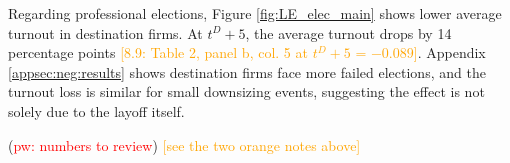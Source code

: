 Regarding professional elections, Figure \ref{fig:LE_elec_main} shows lower average turnout in destination firms. At $t^D+5$, the average turnout drops by 14 percentage points \textcolor{orange}{[8.9: Table 2, panel b, col. 5 at $t^D+5$ = $-0.089$]}. Appendix \ref{appsec:neg:results} shows destination firms face more failed elections, and the turnout loss is similar for small downsizing events, suggesting the effect is not solely due to the layoff itself.

(\textcolor{red}{pw: numbers to review}) \textcolor{orange}{[see the two orange notes above]}


